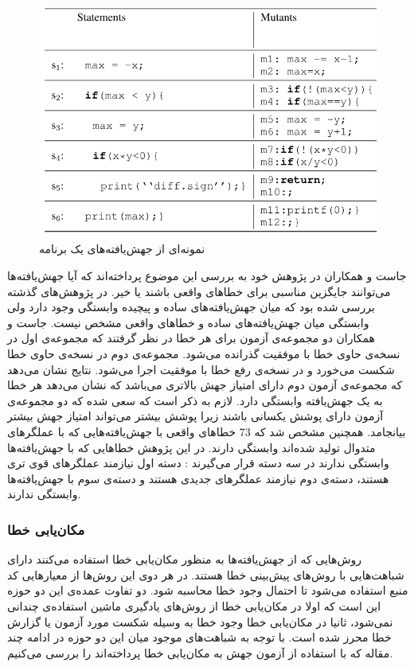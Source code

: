 \begin{figure}[H]
	\centering
	\includegraphics[width=.6\textwidth]{images/mutants.PNG}
	\caption{ نمونه‌ای از جهش‌یافته‌های یک برنامه \cite{moon2014ask}}
	\label{fig:mutant}
\end{figure}
جاست و همکاران در پژوهش خود به بررسی این موضوع پرداخته‌اند که آیا جهش‌یافته‌ها می‌توانند جایگزین مناسبی برای خطاهای واقعی باشند یا خیر\cite{just2014mutants}. در پژوهش‌های گذشته بررسی شده بود که میان جهش‌یافته‌های ساده و پیچیده وابستگی وجود دارد ولی وابستگی میان جهش‌یافته‌های ساده و خطاهای واقعی مشخص نیست. جاست و همکاران دو مجموعه‌ی آزمون برای هر خطا در نظر گرفتند که مجموعه‌ی اول در نسخه‌ی حاوی خطا با موفقیت گذرانده می‌شود. مجموعه‌ی دوم در نسخه‌ی حاوی خطا شکست می‌خورد و در نسخه‌ی رفع خطا با موفقیت اجرا می‌شود. نتایج نشان می‌دهد که مجموعه‌ی آزمون دوم دارای امتیاز جهش بالاتری می‌باشد که نشان می‌دهد هر خطا به یک جهش‌یافته وابستگی دارد. لازم به ذکر است که سعی شده که دو مجموعه‌ی آزمون دارای پوشش یکسانی باشند زیرا پوشش بیشتر می‌تواند امتیاز جهش بیشتر بیانجامد. همچنین مشخص شد که  
73 \lr{\%} 
خطاهای واقعی با جهش‌یافته‌هایی که  با عملگرهای متدوال تولید شده‌اند وابستگی دارند. در این پژوهش خطاهایی که با جهش‌یافته‌ها وابستگی ندارند در سه دسته قرار می‌گیرند : دسته اول نیازمند عملگرهای قوی تری هستند، دسته‌ی دوم نیازمند عملگرهای جدیدی هستند و دسته‌ی سوم با جهش‌یافته‌ها وابستگی ندارند.\\
\subsubsection{مکان‌یابی خطا}
روش‌هایی که از جهش‌یافته‌ها به منظور مکان‌یابی خطا استفاده می‌کنند دارای شباهت‌هایی با روش‌های پیش‌بینی خطا هستند. در هر دوی این روش‌ها از معیارهایی  کد منبع استفاده می‌شود تا احتمال وجود خطا محاسبه شود. دو تفاوت عمده‌ی این دو حوزه این است که اولا در مکان‌یابی خطا از روش‌های یادگیری ماشین استفاده‌ی چندانی نمی‌شود، ثانیا در مکان‌یابی خطا وجود خطا به وسیله شکست مورد آزمون یا گزارش خطا محرز شده است. با توجه به شباهت‌های موجود میان این دو حوزه در ادامه چند مقاله که با استفاده از آزمون جهش به مکان‌یابی خطا پرداخته‌اند را بررسی می‌کنیم. \\

